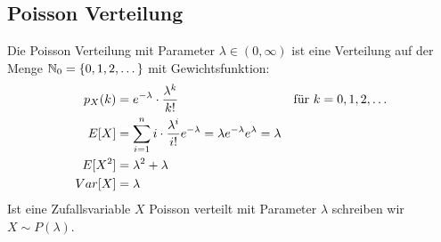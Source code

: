 \subsection*{Poisson Verteilung}
Die Poisson Verteilung mit Parameter $\lambda \in (0, \infty)$ ist eine
Verteilung auf der Menge $\mathbb{N}_0 = \{0, 1, 2, \dots\}$ mit Gewichtsfunktion:
\begin{align*}
  p_X (k) & = e^{-\lambda} \cdot \frac{\lambda^k}{k!}
          &                                                                                            & \text{für } k = 0, 1, 2, \dots \\
  E[X]    & = \sum_{i = 1}^n i \cdot \frac{\lambda^i}{i!} e^{-\lambda} = \lambda e^{-\lambda} e^\lambda = \lambda                                  \\
  E[X^2]  & = \lambda^2 + \lambda                                                                                                       \\
  Var[X]  & = \lambda
\end{align*}
Ist eine Zufallsvariable $X$ Poisson verteilt mit Parameter $\lambda$
schreiben wir $X \sim P (\lambda)$.
